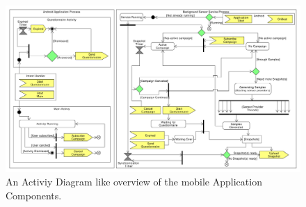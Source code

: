 \begin{figure}[!htbp]
    \centering
    \includegraphics[width=\textwidth]{graphic/backgroundsensorservice/lifecyclestuff.pdf}
    \caption{An Activiy Diagram like overview of the mobile Application Components.}
    \label{fig:system_currency_and_lifecycle}
\end{figure}
\FloatBarrier